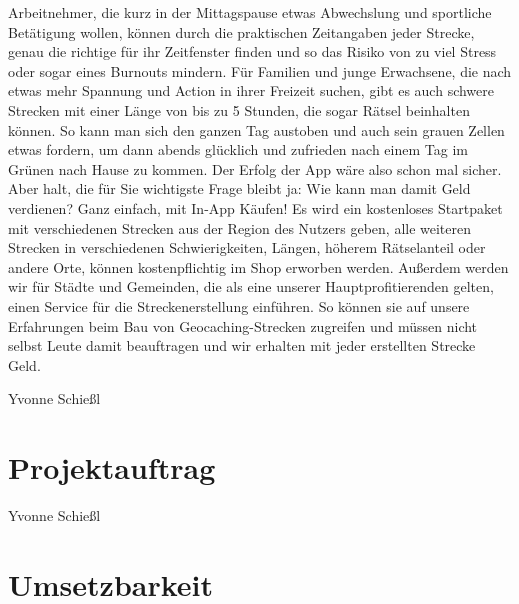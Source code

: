\documentclass[a4paper, 12pt]{article}
\begin{document}
Arbeitnehmer, die kurz in der Mittagspause etwas Abwechslung und sportliche Betätigung wollen, können durch die praktischen Zeitangaben jeder Strecke, genau die richtige für ihr Zeitfenster finden und so das Risiko von zu viel Stress oder sogar eines Burnouts mindern.\newline
Für Familien und junge Erwachsene, die nach etwas mehr Spannung und Action in ihrer Freizeit suchen, gibt es auch schwere Strecken mit einer Länge von bis zu 5 Stunden, die sogar Rätsel beinhalten können. So kann man sich den ganzen Tag austoben und auch sein grauen Zellen etwas fordern, um dann abends glücklich und zufrieden nach einem Tag im Grünen nach Hause zu kommen.\newline
Der Erfolg der App wäre also schon mal sicher. Aber halt, die für Sie wichtigste Frage bleibt ja: Wie kann man damit Geld verdienen? Ganz einfach, mit In-App Käufen!\newline
Es wird ein kostenloses Startpaket mit verschiedenen Strecken aus der Region des Nutzers geben, alle weiteren Strecken in verschiedenen Schwierigkeiten, Längen, höherem Rätselanteil oder andere Orte, können kostenpflichtig im Shop erworben werden. Außerdem werden wir für Städte und Gemeinden, die als eine unserer Hauptprofitierenden gelten, einen Service für die Streckenerstellung einführen. So können sie auf unsere Erfahrungen beim Bau von Geocaching-Strecken zugreifen und müssen nicht selbst Leute damit beauftragen und wir erhalten mit jeder erstellten Strecke Geld.

Yvonne Schießl

\section{Projektauftrag}
\begin{figure}[H] 
	\begin{minipage}{17cm} 
	\end{minipage}
\end{figure}

\begin{figure}[H] 
	\begin{minipage}{17cm} 
	\end{minipage}
\end{figure}

Yvonne Schießl

\section{Umsetzbarkeit}
\end{document}
